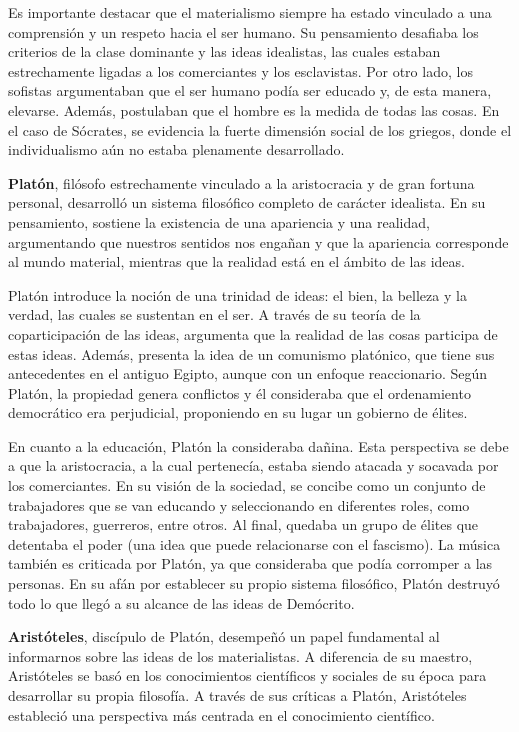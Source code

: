 \documentclass[
  letterpaper,
  DIV=11,
  numbers=noendperiod]{scrartcl}
\begin{document}
Es importante destacar que el materialismo siempre ha estado vinculado a
una comprensión y un respeto hacia el ser humano. Su pensamiento
desafiaba los criterios de la clase dominante y las ideas idealistas,
las cuales estaban estrechamente ligadas a los comerciantes y los
esclavistas. Por otro lado, los sofistas argumentaban que el ser humano
podía ser educado y, de esta manera, elevarse. Además, postulaban que el
hombre es la medida de todas las cosas. En el caso de Sócrates, se
evidencia la fuerte dimensión social de los griegos, donde el
individualismo aún no estaba plenamente desarrollado.

\textbf{Platón}, filósofo estrechamente vinculado a la aristocracia y de
gran fortuna personal, desarrolló un sistema filosófico completo de
carácter idealista. En su pensamiento, sostiene la existencia de una
apariencia y una realidad, argumentando que nuestros sentidos nos
engañan y que la apariencia corresponde al mundo material, mientras que
la realidad está en el ámbito de las ideas.

Platón introduce la noción de una trinidad de ideas: el bien, la belleza
y la verdad, las cuales se sustentan en el ser. A través de su teoría de
la coparticipación de las ideas, argumenta que la realidad de las cosas
participa de estas ideas. Además, presenta la idea de un comunismo
platónico, que tiene sus antecedentes en el antiguo Egipto, aunque con
un enfoque reaccionario. Según Platón, la propiedad genera conflictos y
él consideraba que el ordenamiento democrático era perjudicial,
proponiendo en su lugar un gobierno de élites.

En cuanto a la educación, Platón la consideraba dañina. Esta perspectiva
se debe a que la aristocracia, a la cual pertenecía, estaba siendo
atacada y socavada por los comerciantes. En su visión de la sociedad, se
concibe como un conjunto de trabajadores que se van educando y
seleccionando en diferentes roles, como trabajadores, guerreros, entre
otros. Al final, quedaba un grupo de élites que detentaba el poder (una
idea que puede relacionarse con el fascismo). La música también es
criticada por Platón, ya que consideraba que podía corromper a las
personas. En su afán por establecer su propio sistema filosófico, Platón
destruyó todo lo que llegó a su alcance de las ideas de Demócrito.

\textbf{Aristóteles}, discípulo de Platón, desempeñó un papel
fundamental al informarnos sobre las ideas de los materialistas. A
diferencia de su maestro, Aristóteles se basó en los conocimientos
científicos y sociales de su época para desarrollar su propia filosofía.
A través de sus críticas a Platón, Aristóteles estableció una
perspectiva más centrada en el conocimiento científico.
\end{document}
